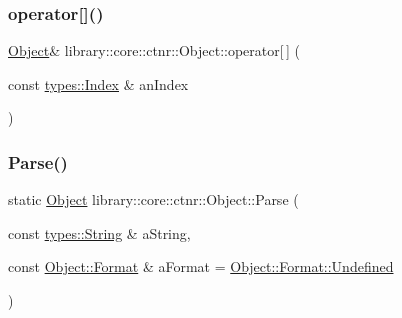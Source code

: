 \mbox{\label{classlibrary_1_1core_1_1ctnr_1_1_object_a20fbb0cb8c3f2eacbc9ae67999cb6a89}} 
\subsubsection{\texorpdfstring{operator[]()}{operator[]()}\hspace{0.1cm}{\footnotesize\ttfamily [4/4]}}
{\footnotesize\ttfamily \hyperlink{classlibrary_1_1core_1_1ctnr_1_1_object}{Object}\& library\+::core\+::ctnr\+::\+Object\+::operator\mbox{[}$\,$\mbox{]} (\begin{DoxyParamCaption}\item[{const \hyperlink{namespacelibrary_1_1core_1_1types_ad87eeb821d7067ec94e06ed1980d6350}{types\+::\+Index} \&}]{an\+Index }\end{DoxyParamCaption})}

\mbox{\label{classlibrary_1_1core_1_1ctnr_1_1_object_a31cb8fb2efb90be411044247b64fe854}} 
\subsubsection{\texorpdfstring{Parse()}{Parse()}}
{\footnotesize\ttfamily static \hyperlink{classlibrary_1_1core_1_1ctnr_1_1_object}{Object} library\+::core\+::ctnr\+::\+Object\+::\+Parse (\begin{DoxyParamCaption}\item[{const \hyperlink{classlibrary_1_1core_1_1types_1_1_string}{types\+::\+String} \&}]{a\+String,  }\item[{const \hyperlink{classlibrary_1_1core_1_1ctnr_1_1_object_a7bf8961c4ef65f691aa2993ec405c647}{Object\+::\+Format} \&}]{a\+Format = {\ttfamily \hyperlink{classlibrary_1_1core_1_1ctnr_1_1_object_a7bf8961c4ef65f691aa2993ec405c647aec0fc0100c4fc1ce4eea230c3dc10360}{Object\+::\+Format\+::\+Undefined}} }\end{DoxyParamCaption})\hspace{0.3cm}{\ttfamily [static]}}

